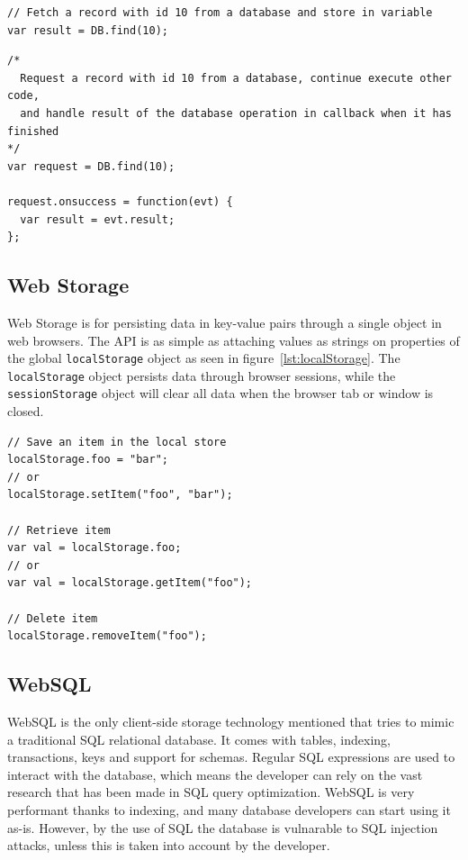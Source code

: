 \begin{Code}
\begin{lstlisting}[caption={Synchronous call}, label={lst:syncCall}]
// Fetch a record with id 10 from a database and store in variable
var result = DB.find(10);
\end{lstlisting}

\begin{lstlisting}[caption={Asynchronous call}, label={lst:asyncCall}]
/*
  Request a record with id 10 from a database, continue execute other code,
  and handle result of the database operation in callback when it has finished
*/
var request = DB.find(10);

request.onsuccess = function(evt) {
  var result = evt.result;
};
\end{lstlisting}
\end{Code}


\subsection{Web Storage}

Web Storage is for persisting data in key-value pairs through a single object in web browsers. The API is as simple as attaching values as strings on properties of the global \texttt{localStorage} object as seen in figure~\ref{lst:localStorage}. The \texttt{localStorage} object persists data through browser sessions, while the \texttt{sessionStorage} object will clear all data when the browser tab or window is closed.

\begin{Code}
\begin{lstlisting}[caption={Use of Web Storage}, label={lst:localStorage}]
// Save an item in the local store
localStorage.foo = "bar";
// or
localStorage.setItem("foo", "bar");

// Retrieve item
var val = localStorage.foo;
// or
var val = localStorage.getItem("foo");

// Delete item
localStorage.removeItem("foo");
\end{lstlisting}
\end{Code}

\subsection{WebSQL}
\label{sec:websql}
WebSQL is the only client-side storage technology mentioned that tries to mimic a traditional SQL relational database. It comes with tables, indexing, transactions, keys and support for schemas. Regular SQL expressions are used to interact with the database, which means the developer can rely on the vast research that has been made in SQL query optimization. WebSQL is very performant thanks to indexing, and many database developers can start using it as-is. However, by the use of SQL the database is vulnarable to SQL injection attacks, unless this is taken into account by the developer.

